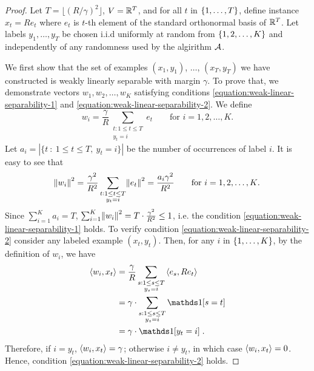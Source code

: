 \begin{proof}
Let $T = \lfloor (R/\gamma)^2 \rfloor$, $V = \mathbb{R}^T$, and for all $t$ in
$\cbr{1,\ldots,T}$, define instance $x_t = R e_t$ where $e_t$ is $t$-th element
of the standard orthonormal basis of $\mathbb{R}^T$.
Let labels $y_1, \ldots, y_T$ be chosen i.i.d uniformly at random from
$\cbr{1,2,\ldots,K}$ and independently of any randomness used by the algirithm
$\mathcal{A}$.




We first show that the set of examples $(x_1,y_1)$, $\ldots$,
$(x_T, y_T)$ we have constructed is weakly linearly separable
with margin $\gamma$. To prove that, we demonstrate vectors $w_1, w_2, \dots, w_K$
satisfying conditions \eqref{equation:weak-linear-separability-1} and
\eqref{equation:weak-linear-separability-2}. We define
$$
w_i = \frac{\gamma}{R} \sum_{\substack{t : 1 \le t \le T \\ y_t = i}} e_t \qquad \text{for $i=1,2,\dots,K$.}
$$
Let $a_i = |\{ t ~:~ 1 \le t \le T, \ y_t = i \}|$ be the number of occurrences of label $i$.
It is easy to see that
$$
\norm{w_i}^2 = \frac{\gamma^2}{R^2} \sum_{\substack{t : 1 \le t \le T \\ y_t = i}} \norm{e_t}^2 = \frac{a_i \gamma^2}{R^2} \qquad \text{for $i=1,2,\dots,K$.}
$$
Since $\sum_{i=1}^K a_i = T$,
$\sum_{i=1}^K \norm{w_i}^2 = T \cdot \frac{\gamma^2}{R^2} \leq 1$, i.e.
the condition
\eqref{equation:weak-linear-separability-1} holds. To verify condition
\eqref{equation:weak-linear-separability-2} consider any labeled example $(x_t,
y_t)$. Then, for any $i$ in $\cbr{1,\ldots,K}$, by the definition of $w_i$, we have
\begin{align*}
\ip{w_i}{x_t}
& = \frac{\gamma}{R} \sum_{\substack{s : 1 \le s \le T \\ y_s = i}} \ip{e_s}{R e_t} \\
& = \gamma \cdot \sum_{\substack{s : 1 \le s \le T \\ y_s = i}} \one[s = t] \\
& = \gamma \cdot \one[y_t = i]
\; .
\end{align*}
Therefore, if $i = y_t$, $\left\langle w_i, x_t \right\rangle = \gamma$;
otherwise $i \neq y_t$, in which case $\left\langle w_i, x_t \right\rangle = 0$.
Hence, condition \eqref{equation:weak-linear-separability-2} holds.


\end{proof}
